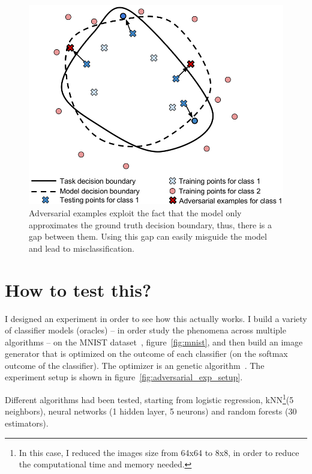   \begin{figure}
    \centering
    \includegraphics[scale=0.3]{images/adv_attack/gen_er4.png}
    \caption{Adversarial examples exploit the fact that the model only approximates the ground truth decision boundary, thus, there is a gap between them. Using this gap can easily misguide the model and lead to misclassification.}
    \label{fig:gen_er4}
  \end{figure}

\section{How to test this?}
  \par I designed an experiment in order to see how this actually works. I build a variety of classifier models (oracles) -- in order study the phenomena across multiple algorithms -- on the MNIST dataset~\citep{lecun-mnisthandwrittendigit-2010}, figure~\ref{fig:mnist}, and then build an image generator that is optimized on the outcome of each classifier (on the softmax outcome of the classifier). The optimizer is an genetic algorithm~\citep{eiben2003introduction}. The experiment setup is shown in figure~\ref{fig:adversarial_exp_setup}.

  Different algorithms had been tested, starting from logistic regression, kNN\footnote{In this case, I reduced the images size from 64x64 to 8x8, in order to reduce the computational time and memory needed.}(5 neighbors), neural networks (1 hidden layer, 5 neurons) and random forests (30 estimators).


